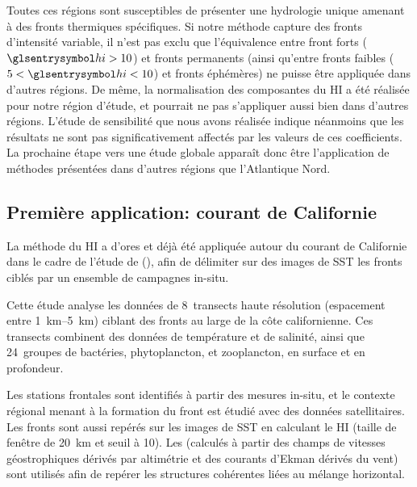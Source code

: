 Toutes ces régions sont susceptibles de présenter une hydrologie unique amenant à des fronts thermiques spécifiques.
Si notre méthode capture des fronts d'intensité variable, il n'est pas exclu que l'équivalence entre front forts (\(\am{hi}>10\)) et fronts permanents (ainsi qu'entre fronts faibles (\(5<\am{hi}<10\)) et fronts éphémères) ne puisse être appliquée dans d'autres régions.
De même, la normalisation des composantes du HI a été réalisée pour notre région d'étude, et pourrait ne pas s'appliquer aussi bien dans d'autres régions.
L'étude de sensibilité que nous avons réalisée indique néanmoins que les résultats  ne sont pas significativement affectés par les valeurs de ces coefficients.
La prochaine étape vers une étude globale apparaît donc être l'application de méthodes présentées dans d'autres régions que l'Atlantique Nord.

\subsection{Première application: courant de Californie}
\label{sec:cce}

La méthode du HI a d'ores et déjà été appliquée autour du courant de Californie dans le cadre de l'étude de \textcite{mangolte_2023} (), afin de délimiter sur des images de SST les fronts ciblés par un ensemble de campagnes in-situ.

Cette étude analyse les données de 8~transects haute résolution (espacement entre \qtyrange[range-phrase={ et }]{1}{5}{\km}) ciblant des fronts au large de la côte californienne.
Ces transects combinent des données de température et de salinité, ainsi que 24~groupes de bactéries, phytoplancton, et zooplancton, en surface et en profondeur.

Les stations frontales sont identifiés à partir des mesures in-situ, et le contexte régional menant à la formation du front est étudié avec des données satellitaires.
Les fronts sont aussi repérés sur les images de SST en calculant le HI (taille de fenêtre de \qty{20}{\km} et seuil à \num{10}).
Les   (calculés à partir des champs de vitesses géostrophiques dérivés par altimétrie et des courants d'Ekman dérivés du vent) sont utilisés afin de repérer les structures cohérentes liées au mélange horizontal.


